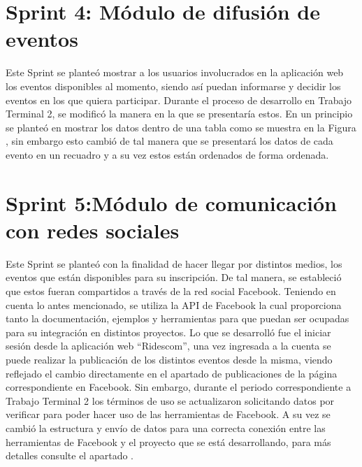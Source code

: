 	\section{Sprint 4: Módulo de difusión de eventos}
	\noindent Este Sprint se planteó mostrar a los usuarios involucrados en la aplicación web los eventos disponibles al momento, siendo así puedan informarse y decidir los eventos en los que quiera participar. Durante el proceso de desarrollo en Trabajo Terminal 2, se modificó la manera en la que se presentaría estos. 
	En un principio se planteó en mostrar los datos dentro de una tabla como se muestra en la Figura  , sin embargo esto cambió de tal manera que se presentará los datos de cada evento en un recuadro y a su vez estos están ordenados de forma ordenada.
	\pagebreak
		
	\section{Sprint 5:Módulo de comunicación con redes sociales}	
	\noindent Este Sprint se planteó con la finalidad de hacer llegar por distintos medios, los eventos que están disponibles para su inscripción. De tal manera, se estableció que estos fueran compartidos a través de la red social Facebook.
	Teniendo en cuenta lo antes mencionado, se utiliza la API de Facebook la cual proporciona tanto la documentación, ejemplos y herramientas para que puedan ser ocupadas para su integración en distintos proyectos.
	Lo que se desarrolló fue el iniciar sesión desde la aplicación web “Ridescom”, una vez ingresada a la cuenta se puede realizar la publicación de los distintos eventos desde la misma, viendo reflejado el cambio directamente en el apartado de publicaciones de la página correspondiente en Facebook.
	Sin embargo, durante el periodo correspondiente a Trabajo Terminal 2 los términos de uso se actualizaron solicitando datos por verificar para poder hacer uso de las herramientas de Facebook. A su vez se cambió la estructura y envío de  datos para una correcta conexión entre las herramientas de Facebook y el proyecto que se está desarrollando, para más detalles consulte el apartado  .
	
